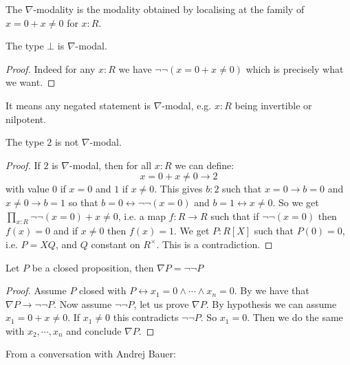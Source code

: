 \begin{definition}
The $\nabla$-modality is the modality obtained by localising at the family of $x=0+x\not=0$ for $x:R$.
\end{definition}

\begin{lemma}\label{bot-nabla-modal}
The type $\bot$ is $\nabla$-modal.
\end{lemma}

\begin{proof}
Indeed for any $x:R$ we have $\neg\neg(x=0 + x\not=0)$ which is precisely what we want.
\end{proof}

\begin{remark}
It means any negated statement is $\nabla$-modal, e.g. $x:R$ being invertible or nilpotent.
\end{remark}

\begin{lemma}
The type $2$ is not $\nabla$-modal.
\end{lemma}

\begin{proof}
If $2$ is $\nabla$-modal, then for all $x:R$ we can define:
\[x=0+x\not=0\to 2\]
with value $0$ if $x=0$ and $1$ if $x\not=0$. This gives $b:2$ such that $x=0 \to b=0$ and $x\not=0\to b=1$ so that $b=0 \leftrightarrow \neg\neg(x=0)$ and $b=1\leftrightarrow x\not=0$. So we get $\prod_{x:R} \neg\neg(x=0)+x\not=0$, i.e. a map $f:R\to R$ such that if $\neg\neg(x=0)$ then $f(x)=0$ and if $x\not=0$ then $f(x)=1$. We get $P:R[X]$ such that $P(0)=0$, i.e. $P = XQ$, and $Q$ constant on $R^\times$. This is a contradiction.
\end{proof}

\begin{lemma}\label{nabla-closed-not-not}
Let $P$ be a closed proposition, then $\nabla P = \neg\neg P$
\end{lemma}

\begin{proof}
Assume $P$ closed with $P \leftrightarrow x_1=0\land\cdots\land x_n=0$. By  we have that $\nabla P\to \neg\neg P$. Now assume $\neg\neg P$, let us prove $\nabla P$. By hypothesis we can assume $x_1=0+x\not=0$. If $x_1\not=0$ this contradicts $\neg\neg P$. So $x_1=0$. Then we do the same with $x_2,\cdots,x_n$ and conclude $\nabla P$.
\end{proof}

From a conversation with Andrej Bauer:

